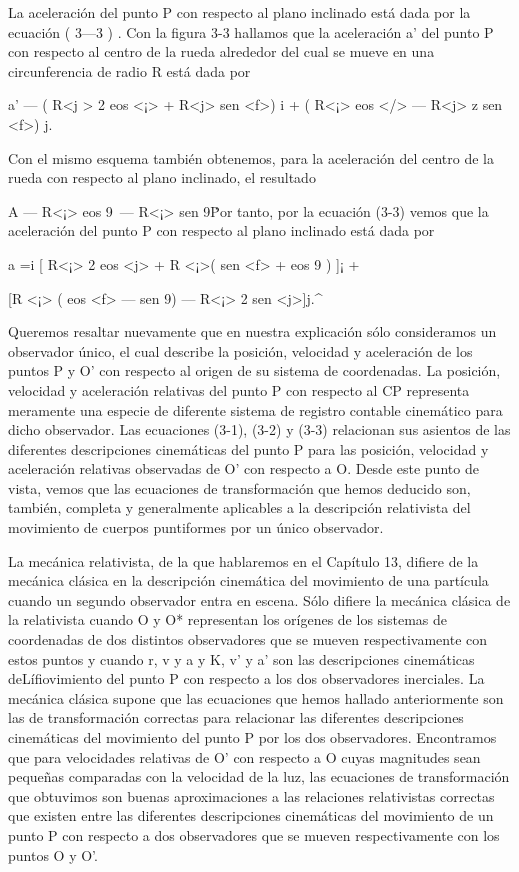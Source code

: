 La aceleración del punto P con respecto al plano inclinado está dada por la ecuación ( 3—3 ) . Con la figura 3-3 hallamos que la aceleración a' del punto P con respecto al centro de la rueda alrededor del cual se mueve en una circunferencia de radio R está dada por 

a' — ( R<j > 2 eos <¡> + R<j> sen <f>) i + ( R<¡> eos </> — R<j> z sen <f>) j. 

Con el mismo esquema también obtenemos, para la aceleración del centro de la rueda con respecto al plano inclinado, el resultado 

A — R<¡> eos 9\ — R<¡> sen 9\. 

Por tanto, por la ecuación (3-3) vemos que la aceleración del punto P con respecto al plano inclinado está dada por 

a =i [ R<¡> 2 eos <j> + R <¡>( sen <f> + eos 9 ) ]¡ + 

[R <¡> ( eos <f> — sen 9) — R<¡> 2 sen <j>]j.^ 

Queremos resaltar nuevamente que en nuestra explicación sólo consideramos un observador único, el cual describe la posición, velocidad y aceleración de los puntos P y O' con respecto al origen de su sistema de coordenadas. La posición, velocidad y aceleración relativas del punto P con respecto al CP representa meramente una especie de diferente sistema de registro contable cinemático para dicho observador. Las ecuaciones (3-1), (3-2) y (3-3) relacionan sus asientos de las diferentes descripciones cinemáticas del punto P para las posición, velocidad y aceleración relativas observadas de O' con respecto a O. Desde este punto de vista, vemos que las ecuaciones de transformación que hemos deducido son, también, completa 
y generalmente aplicables a la descripción relativista del movimiento de cuerpos puntiformes por un único observador. 

La mecánica relativista, de la que hablaremos en el Capítulo 13, difiere de la mecánica clásica en la descripción cinemática del movimiento de una partícula cuando un segundo observador entra en escena. Sólo difiere la mecánica clásica de la relativista cuando O y O* representan los orígenes de los sistemas de coordenadas de dos distintos observadores que se mueven respectivamente con estos puntos y cuando r, v y a y K, v' y a' son las descripciones cinemáticas deLífiovimiento del punto P con respecto a los dos observadores inerciales. La mecánica clásica supone que las ecuaciones que hemos hallado anteriormente son las de transformación correctas para relacionar las diferentes descripciones cinemáticas del movimiento del punto P por los dos observadores. Encontramos que para velocidades relativas de O' con respecto a O cuyas magnitudes sean pequeñas comparadas con la velocidad de la luz, las ecuaciones de transformación que obtuvimos son buenas aproximaciones a las relaciones relativistas correctas que existen entre las diferentes descripciones cinemáticas del movimiento de un punto P con respecto a dos observadores que se mueven respectivamente con los puntos O y O'. 


